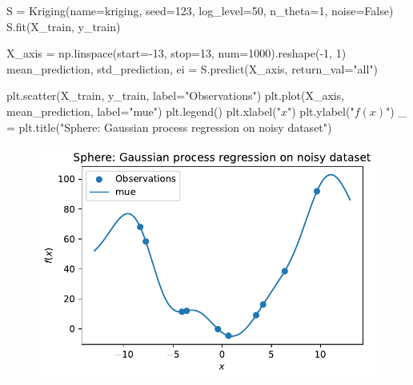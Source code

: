 \documentclass[
  letterpaper,
  DIV=11,
  numbers=noendperiod]{scrreprt}
\newenvironment{Shaded}{\begin{snugshade}}{\end{snugshade}}
\newcommand{\DecValTok}[1]{\textcolor[rgb]{0.68,0.00,0.00}{#1}}
\newcommand{\NormalTok}[1]{\textcolor[rgb]{0.00,0.23,0.31}{#1}}
\newcommand{\OperatorTok}[1]{\textcolor[rgb]{0.37,0.37,0.37}{#1}}
\newcommand{\StringTok}[1]{\textcolor[rgb]{0.13,0.47,0.30}{#1}}
\newcommand{\VariableTok}[1]{\textcolor[rgb]{0.07,0.07,0.07}{#1}}
\begin{document}
\begin{Shaded}
\begin{Highlighting}[]
\NormalTok{S }\OperatorTok{=}\NormalTok{ Kriging(name}\OperatorTok{=}\StringTok{\textquotesingle{}kriging\textquotesingle{}}\NormalTok{,}
\NormalTok{            seed}\OperatorTok{=}\DecValTok{123}\NormalTok{,}
\NormalTok{            log\_level}\OperatorTok{=}\DecValTok{50}\NormalTok{,}
\NormalTok{            n\_theta}\OperatorTok{=}\DecValTok{1}\NormalTok{,}
\NormalTok{            noise}\OperatorTok{=}\VariableTok{False}\NormalTok{)}
\NormalTok{S.fit(X\_train, y\_train)}

\NormalTok{X\_axis }\OperatorTok{=}\NormalTok{ np.linspace(start}\OperatorTok{={-}}\DecValTok{13}\NormalTok{, stop}\OperatorTok{=}\DecValTok{13}\NormalTok{, num}\OperatorTok{=}\DecValTok{1000}\NormalTok{).reshape(}\OperatorTok{{-}}\DecValTok{1}\NormalTok{, }\DecValTok{1}\NormalTok{)}
\NormalTok{mean\_prediction, std\_prediction, ei }\OperatorTok{=}\NormalTok{ S.predict(X\_axis, return\_val}\OperatorTok{=}\StringTok{"all"}\NormalTok{)}

\NormalTok{plt.scatter(X\_train, y\_train, label}\OperatorTok{=}\StringTok{"Observations"}\NormalTok{)}
\NormalTok{plt.plot(X\_axis, mean\_prediction, label}\OperatorTok{=}\StringTok{"mue"}\NormalTok{)}
\NormalTok{plt.legend()}
\NormalTok{plt.xlabel(}\StringTok{"$x$"}\NormalTok{)}
\NormalTok{plt.ylabel(}\StringTok{"$f(x)$"}\NormalTok{)}
\NormalTok{\_ }\OperatorTok{=}\NormalTok{ plt.title(}\StringTok{"Sphere: Gaussian process regression on noisy dataset"}\NormalTok{)}
\end{Highlighting}
\end{Shaded}

\begin{figure}[H]

{\centering \includegraphics{09_spot_ocba_files/figure-pdf/cell-10-output-1.pdf}

}

\end{figure}
\end{document}
